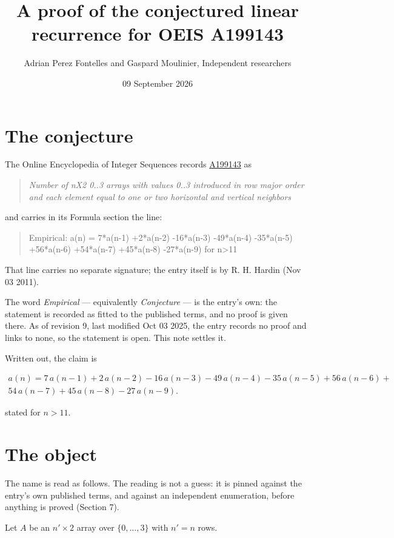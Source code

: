\documentclass[11pt]{article}
\title{A proof of the conjectured linear recurrence for OEIS A199143}
\author{Adrian Perez Fontelles and Gaspard Moulinier, Independent researchers}
\date{09 September 2026}
\theoremstyle{definition}
\begin{document}
\maketitle
\section{The conjecture}

The Online Encyclopedia of Integer Sequences records \href{https://oeis.org/A199143}{A199143} as

\begin{quote}\itshape Number of nX2 0..3 arrays with values 0..3 introduced in row major order and each element equal to one or two horizontal and vertical neighbors\end{quote}

and carries in its Formula section the line:

\begin{quote}\ttfamily Empirical: a(n) = 7*a(n-1) +2*a(n-2) -16*a(n-3) -49*a(n-4) -35*a(n-5) +56*a(n-6) +54*a(n-7) +45*a(n-8) -27*a(n-9) for n>11\end{quote}

That line carries no separate signature; the entry itself is by R. H. Hardin (Nov 03 2011).

The word {\itshape Empirical} --- equivalently {\itshape Conjecture} --- is the entry's own: the statement is recorded as fitted to the published terms, and no proof is given there. As of revision 9, last modified Oct 03 2025, the entry records no proof and links to none, so the statement is open. This note settles it.

Written out, the claim is

\begin{multline*} a(n) = 7\,a(n-1) + 2\,a(n-2) - 16\,a(n-3) - 49\,a(n-4) - 35\,a(n-5) + 56\,a(n-6) + \\ 54\,a(n-7) + 45\,a(n-8) - 27\,a(n-9). \end{multline*}

stated for $n > 11$.

\section{The object}

The name is read as follows. The reading is not a guess: it is pinned against the entry's own published terms, and against an independent enumeration, before anything is proved (Section 7).

Let $A$ be an $n' \times 2$ array over $\{0,\dots,3\}$ with $n' = n$ rows.
\end{document}
